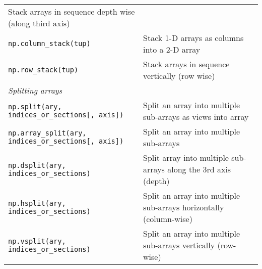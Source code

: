 \documentclass[a4paper,11pt]{book}
\numberwithin{figure}{chapter}
\numberwithin{table}{chapter}
\begin{document}
\begin{appendices}
\begin{table}
\begin{tabular}{p{7.5cm}p{8.5cm}}
                Stack arrays in sequence depth wise (along third axis)\\
                \texttt{np.column\_stack(tup)} &
                Stack 1-D arrays as columns into a 2-D array\\
                \texttt{np.row\_stack(tup)} &
                Stack arrays in sequence vertically (row wise)\\
		\midrule
		\multicolumn{1}{l}{\textit{Splitting arrays}} \\
		\midrule
                \texttt{np.split(ary, indices\_or\_sections[, axis])}&
		Split an array into multiple sub-arrays as views into array\\
                \texttt{np.array\_split(ary, indices\_or\_sections[, axis])}&
                Split an array into multiple sub-arrays\\
                \texttt{np.dsplit(ary, indices\_or\_sections)}&
                Split array into multiple sub-arrays along the 3rd axis (depth)\\
                \texttt{np.hsplit(ary, indices\_or\_sections)}&
                Split an array into multiple sub-arrays horizontally (column-wise)\\
                \texttt{np.vsplit(ary, indices\_or\_sections)}&
                Split an array into multiple sub-arrays vertically (row-wise)\\
		\midrule
	\end{tabular}
\end{table}
\clearpage


\end{appendices}
\end{document}
